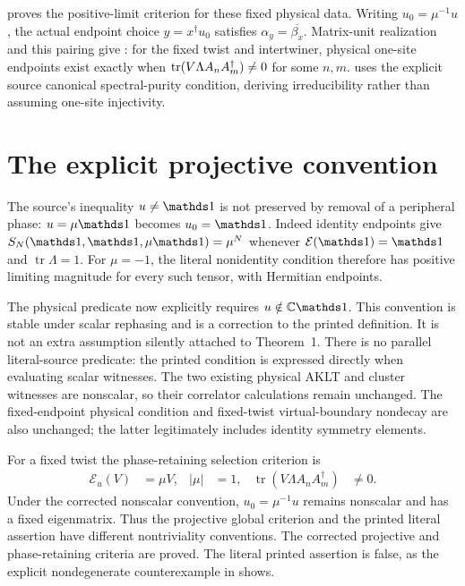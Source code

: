 \documentclass[11pt]{article}
\begin{document}
proves the positive-limit criterion for these fixed physical data.
Writing $u_0=\mu^{-1}u$, the actual endpoint choice
$y=x^\dagger u_0$ satisfies $\alpha_y=\overline{\beta_x}$.
Matrix-unit realization and this pairing give
:
for the fixed twist and intertwiner, physical one-site endpoints exist
exactly when $\operatorname{tr}(V\Lambda A_nA_m^\dagger)\ne0$ for some $n,m$.
 uses the
explicit source canonical spectral-purity condition, deriving irreducibility
rather than assuming one-site injectivity.

\section{The explicit projective convention}

The source's inequality $u\ne\Id$ is not preserved by removal of a
peripheral phase: $u=\mu\Id$ becomes $u_0=\Id$.
Indeed identity endpoints give
$S_N(\Id,\Id,\mu\Id)=\mu^N$ whenever
$\mathcal E(\Id)=\Id$ and $\operatorname{tr}\Lambda=1$.
For $\mu=-1$, the literal nonidentity condition therefore has positive
limiting magnitude for every such tensor, with Hermitian endpoints.

The physical predicate now explicitly requires $u\notin\C\Id$.
This convention is stable under scalar rephasing and is a correction to the
printed definition. It is not an extra assumption silently attached to
Theorem~1. There is no parallel literal-source predicate: the printed
condition is expressed directly when evaluating scalar witnesses.
The two existing physical AKLT and cluster witnesses are nonscalar, so their
correlator calculations remain unchanged. The fixed-endpoint physical
condition and fixed-twist virtual-boundary nondecay are also unchanged;
the latter legitimately includes identity symmetry elements.

For a fixed twist the phase-retaining selection criterion is
\begin{align}
    \mathcal E_u(V) & =\mu V,
                    & |\mu|                                      & =1,
                    & \operatorname{tr}(V\Lambda A_nA_m^\dagger) & \ne0.
    \label{eq:pgwsvc08_projective_peripheral_criterion}
\end{align}
Under the corrected nonscalar convention, $u_0=\mu^{-1}u$ remains nonscalar
and has a fixed eigenmatrix. Thus the projective global criterion and the
printed literal assertion have different nontriviality conventions.
The corrected projective and phase-retaining criteria are proved. The
literal printed assertion is false, as the explicit nondegenerate
counterexample in  shows.
\end{document}
